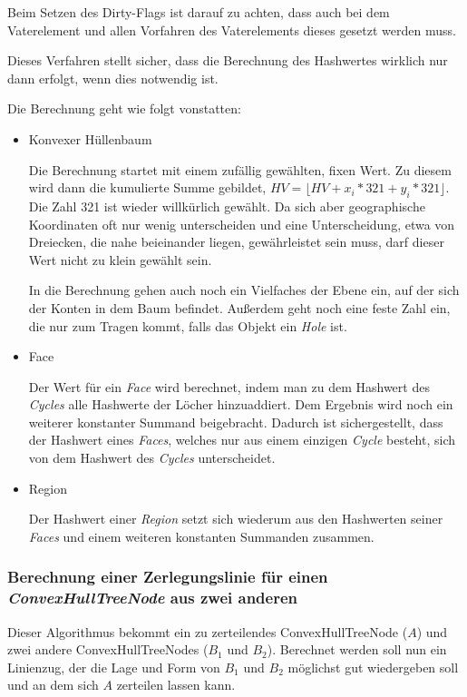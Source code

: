 Beim Setzen des Dirty-Flags ist darauf zu achten, dass auch bei dem Vaterelement und allen Vorfahren des Vaterelements dieses gesetzt werden muss.

Dieses Verfahren stellt sicher, dass die Berechnung des Hashwertes wirklich nur dann erfolgt, wenn dies notwendig ist.

Die Berechnung geht wie folgt vonstatten:

\begin{itemize}
\item Konvexer Hüllenbaum

Die Berechnung startet mit einem zufällig  gewählten, fixen Wert. Zu diesem wird dann die kumulierte Summe gebildet, $HV=\lfloor HV+x_i*321+y_i*321\rfloor$. Die Zahl 321 ist wieder willkürlich gewählt. Da sich aber geographische Koordinaten oft nur wenig unterscheiden und eine Unterscheidung, etwa von Dreiecken, die nahe beieinander liegen, gewährleistet sein muss, darf dieser Wert nicht zu klein gewählt sein. 

In die Berechnung gehen auch noch ein Vielfaches der Ebene ein, auf der sich der Konten in dem Baum  befindet. Außerdem geht noch eine feste Zahl ein, die nur zum Tragen kommt, falls das Objekt ein \textit{Hole} ist.

\item Face

Der Wert für ein \textit{Face} wird berechnet, indem man zu dem Hashwert des \textit{Cycles} alle Hashwerte der Löcher hinzuaddiert. Dem Ergebnis wird noch ein weiterer konstanter Summand beigebracht. Dadurch ist sichergestellt, dass der Hashwert eines \textit{Faces}, welches nur aus einem einzigen \textit{Cycle} besteht, sich von dem Hashwert des \textit{Cycles} unterscheidet.

\item Region

Der Hashwert einer \textit{Region} setzt sich wiederum aus den Hashwerten seiner \textit{Faces} und einem weiteren konstanten Summanden zusammen.
\end{itemize}

\subsubsection{Berechnung einer Zerlegungslinie für einen \textit{ConvexHullTreeNode} aus zwei anderen}\label{ZerteilungsAlgo}

Dieser Algorithmus bekommt ein zu zerteilendes ConvexHullTreeNode ($A$) und zwei andere ConvexHullTreeNodes ($B_1$ und $B_2$). Berechnet werden soll nun ein Linienzug, der die Lage und Form von $B_1$ und $B_2$ möglichst gut wiedergeben soll und an dem sich $A$ zerteilen lassen kann.


